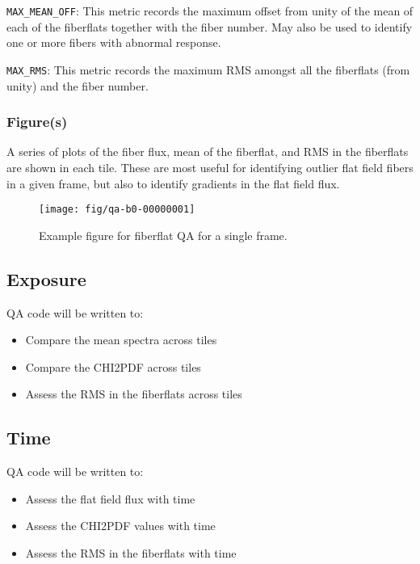 \documentclass[12pt]{article}
\newenvironment{myitemize}
{ \begin{itemize}
    \setlength{\itemsep}{0pt}
    \setlength{\parskip}{0pt}
    \setlength{\parsep}{0pt}     }
{ \end{itemize}                  }
\begin{document}
\noindent
{\tt MAX\_MEAN\_OFF}:  This metric records the maximum offset from
unity of the mean of each of the fiberflats together with the
fiber number.  May also be used
to identify one or more fibers with abnormal response.

\noindent
{\tt MAX\_RMS}:  This metric records the maximum RMS amongst
all the fiberflats (from unity) and the fiber number.

\subsubsection{Figure(s)}

A series of plots of the fiber flux, mean of the fiberflat, and
RMS in the fiberflats are shown in each tile.
These are most useful for identifying outlier flat field
fibers in a given frame, but also to identify gradients 
in the flat field flux.

\begin{figure}[htb]
\begin{center}
\texttt{[image: fig/qa-b0-00000001]}
\caption{Example figure for fiberflat QA
for a single frame.  
}
\label{fig:fiberflat_frame}
\end{center}
\end{figure}


\subsection{Exposure}

QA code will be written to:

\begin{myitemize}
\item Compare the mean spectra across tiles 
\item Compare the CHI2PDF across tiles
\item Assess the RMS in the fiberflats across tiles
\end{myitemize}

\subsection{Time}

QA code will be written to:

\begin{myitemize}
\item Assess the flat field flux with time
\item Assess the CHI2PDF values with time
\item Assess the RMS in the fiberflats with time
\end{myitemize}
\end{document}

